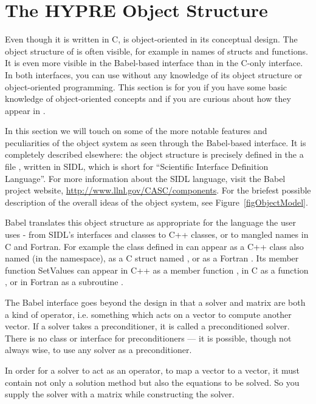 \section{The HYPRE Object Structure}
\label{sec-ObjectStructure}

Even though it is written in C, \hypre{} is object-oriented in its
conceptual design.  The object structure of \hypre{} is often visible,
for example in names of structs and functions.  It is even more
visible in the Babel-based interface than in the C-only interface.  In
both interfaces, you can use \hypre{} without any knowledge of its
object structure or object-oriented programming.  This section is for
you if you have some basic knowledge of object-oriented concepts and
if you are curious about how they appear in \hypre{}.

In this section we will touch on some of the more notable features and
peculiarities of the object system as seen through the Babel-based
interface.  It is completely described elsewhere: the object structure
is precisely defined in the a file , written in
SIDL, which is short for ``Scientific Interface Definition Language''.
For more information about the SIDL language, visit the Babel project
website, \url{http://www.llnl.gov/CASC/components}.  For the briefest
possible description of the overall ideas of the \hypre{} object
system, see Figure~\ref{figObjectModel}.

Babel translates this object structure as appropriate for the language
the user uses - from SIDL's interfaces and classes to C++ classes, or
to mangled names in C and Fortran.  For example the
 class defined in  can appear
as a C++ class also named  (in the 
namespace), as a C struct named , or as a
Fortran .  Its member function SetValues can appear in
C++ as a member function , in C as a function
, or in Fortran as a subroutine
.

The Babel interface goes beyond the \hypre{} design in that a solver
and matrix are both a kind of operator, i.e. something which acts on a
vector to compute another vector.  If a solver takes a preconditioner,
it is called a preconditioned solver.  There is no class or interface
for preconditioners --- it is possible, though not always wise, to use
any solver as a preconditioner.

In order for a solver to act as an operator, to map a vector to a
vector, it must contain not only a solution method but also the
equations to be solved.  So you supply the solver with a matrix while
constructing the solver.

